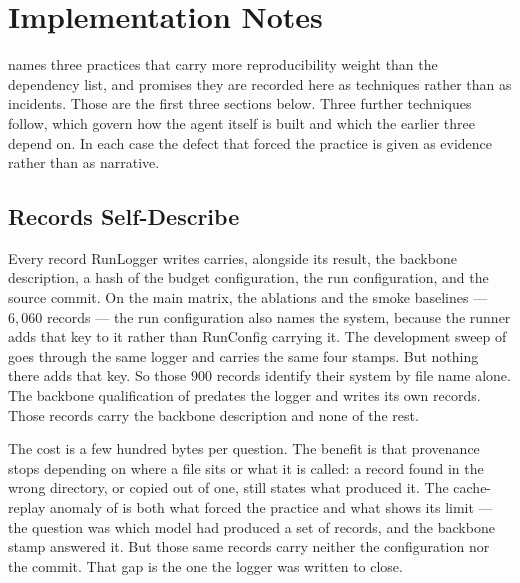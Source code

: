 \chapter{Implementation Notes}\label{app:implementation}


 names three practices that carry more reproducibility
weight than the dependency list, and promises they are recorded here as
techniques rather than as incidents. Those are the first three sections below.
Three further techniques follow, which govern how the agent itself is built and
which the earlier three depend on. In each case the defect that forced the
practice is given as evidence rather than as narrative.

\section{Records Self-Describe}\label{app:self-describing}

Every record \textsf{RunLogger} writes carries, alongside its result, the
backbone description, a hash of the budget configuration, the run configuration,
and the source commit. On the main matrix, the ablations and the smoke baselines
--- $6{,}060$ records --- the run configuration also names the system, because
the runner adds that key to it rather than \textsf{RunConfig} carrying it. The
development sweep of  goes through the same logger and
carries the same four stamps. But nothing there adds that key. So those $900$
records identify their system by file name alone. The backbone qualification of
 predates the logger and writes its own records. Those
records carry the backbone description and none of the rest.

The cost is a few hundred bytes per question. The benefit is that provenance
stops depending on where a file sits or what it is called: a record found in the
wrong directory, or copied out of one, still states what produced it. The
cache-replay anomaly of  is both what forced the practice and
what shows its limit --- the question was which model had produced a set of
records, and the backbone stamp answered it. But those same records carry
neither the configuration nor the commit. That gap is the one the logger was
written to close.

